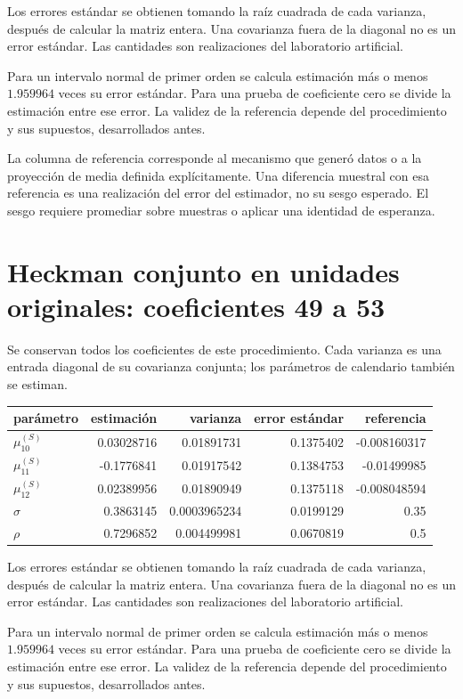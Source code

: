 \documentclass[11pt,a4paper]{article}
\begin{document}
Los errores estándar se obtienen tomando la raíz cuadrada de cada varianza, después de calcular la matriz entera. Una covarianza fuera de la diagonal no es un error estándar. Las cantidades son realizaciones del laboratorio artificial.

Para un intervalo normal de primer orden se calcula estimación más o menos $1.959964$ veces su error estándar. Para una prueba de coeficiente cero se divide la estimación entre ese error. La validez de la referencia depende del procedimiento y sus supuestos, desarrollados antes.

La columna de referencia corresponde al mecanismo que generó datos o a la proyección de media definida explícitamente. Una diferencia muestral con esa referencia es una realización del error del estimador, no su sesgo esperado. El sesgo requiere promediar sobre muestras o aplicar una identidad de esperanza.

\clearpage
\section{Heckman conjunto en unidades originales: coeficientes 49 a 53}
Se conservan todos los coeficientes de este procedimiento. Cada varianza es una entrada diagonal de su covarianza conjunta; los parámetros de calendario también se estiman.
\begin{center}\small
\begin{tabular}{lrrrr}
\toprule
parámetro & estimación & varianza & error estándar & referencia\\\midrule
$\mu_10^{(S)}$ & 0.03028716 & 0.01891731 & 0.1375402 & -0.008160317\\
$\mu_11^{(S)}$ & -0.1776841 & 0.01917542 & 0.1384753 & -0.01499985\\
$\mu_12^{(S)}$ & 0.02389956 & 0.01890949 & 0.1375118 & -0.008048594\\
$\sigma$ & 0.3863145 & 0.0003965234 & 0.0199129 & 0.35\\
$\rho$ & 0.7296852 & 0.004499981 & 0.0670819 & 0.5\\
\bottomrule
\end{tabular}\end{center}

Los errores estándar se obtienen tomando la raíz cuadrada de cada varianza, después de calcular la matriz entera. Una covarianza fuera de la diagonal no es un error estándar. Las cantidades son realizaciones del laboratorio artificial.

Para un intervalo normal de primer orden se calcula estimación más o menos $1.959964$ veces su error estándar. Para una prueba de coeficiente cero se divide la estimación entre ese error. La validez de la referencia depende del procedimiento y sus supuestos, desarrollados antes.
\end{document}
